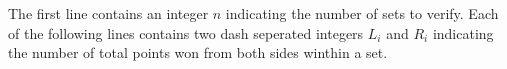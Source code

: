 The first line contains an integer $n$ indicating the number of sets to verify.
Each of the following lines contains two dash seperated integers $L_i$ and $R_i$
indicating the number of total points won from both sides winthin a set.
